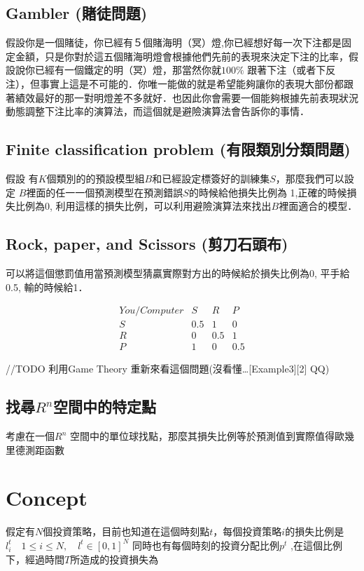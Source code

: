 \documentclass[12pt]{report}
\numberwithin{equation}{section}
\begin{document}
\begin{CJK}{UTF8}{bsmi}
\subsection {Gambler (賭徒問題)}
假設你是一個賭徒，你已經有５個賭海明（冥）燈,你已經想好每一次下注都是固定金額，只是你對於這五個賭海明燈會根據他們先前的表現來決定下注的比率，假設說你已經有一個鐵定的明（冥）燈，那當然你就$100\%$ 跟著下注（或者下反注），但事實上這是不可能的．你唯一能做的就是希望能夠讓你的表現大部份都跟著績效最好的那一對明燈差不多就好．也因此你會需要一個能夠根據先前表現狀況動態調整下注比率的演算法，而這個就是避險演算法會告訴你的事情．

\subsection{ Finite classification problem (有限類別分類問題)}
假設 有$K$個類別的的預設模型組$B$和已經設定標簽好的訓練集$S$，那麼我們可以設定 $B$裡面的任一一個預測模型在預測錯誤$S$的時候給他損失比例為 1,正確的時候損失比例為0, 利用這樣的損失比例，可以利用避險演算法來找出$B$裡面適合的模型．

\subsection{ Rock, paper, and Scissors (剪刀石頭布)}
可以將這個懲罰值用當預測模型猜贏實際對方出的時候給於損失比例為0, 平手給0.5, 輸的時候給1．

\[
\begin{array}{clcr} 
You  / Computer & S & R & P \\
S & 0.5 & 1 & 0 \\
R & 0 & 0.5 &  1 \\
P &  1 & 0 & 0.5 
\end{array}
\]



//TODO 利用Game Theory 重新來看這個問題(沒看懂…[Example3][2] QQ)
\subsection {找尋$R^n$空間中的特定點}
考慮在一個$R^n$ 空間中的單位球找點，那麼其損失比例等於預測值到實際值得歐幾里德測距函數




\section {Concept}

假定有$N$個投資策略，目前也知道在這個時刻點$t$，每個投資策略$i$的損失比例是$l_i^t \quad 1\leq i \leq N, \quad l^t \in [0,1]^N $ 同時也有每個時刻的投資分配比例$p^t$ ,在這個比例下，經過時間$T$所造成的投資損失為


\end{CJK}
\end{document}
